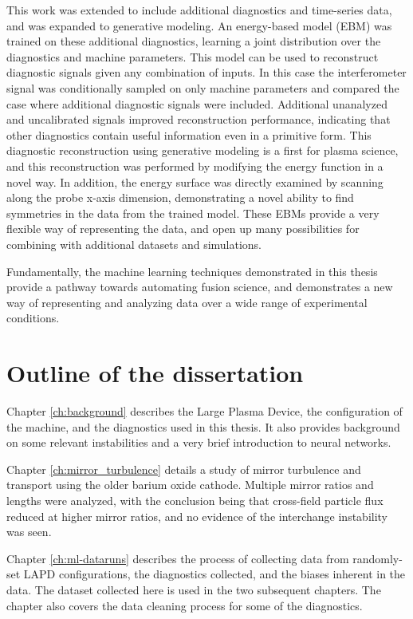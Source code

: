 This work was extended to include additional diagnostics and time-series data, and was expanded to generative modeling. An energy-based model (EBM) was trained on these additional diagnostics, learning a joint distribution over the diagnostics and machine parameters. This model can be used to reconstruct diagnostic signals given any combination of inputs. In this case the interferometer signal was conditionally sampled on only machine parameters and compared the case where additional diagnostic signals were included. Additional unanalyzed and uncalibrated signals improved reconstruction performance, indicating that other diagnostics contain useful information even in a primitive form. This diagnostic reconstruction using generative modeling is a first for plasma science, and this reconstruction was performed by modifying the energy function in a novel way. In addition, the energy surface was directly examined by scanning along the probe x-axis dimension, demonstrating a novel ability to find symmetries in the data from the trained model. These EBMs provide a very flexible way of representing the data, and open up many possibilities for combining with additional datasets and simulations.

Fundamentally, the machine learning techniques demonstrated in this thesis provide a pathway towards automating fusion science, and demonstrates a new way of representing and analyzing data over a wide range of experimental conditions. 

\section{Outline of the dissertation}
Chapter \ref{ch:background} describes the Large Plasma Device, the configuration of the machine, and the diagnostics used in this thesis. It also provides background on some relevant instabilities and a very brief introduction to neural networks. 

Chapter \ref{ch:mirror_turbulence} details a study of mirror turbulence and transport using the older barium oxide cathode. Multiple mirror ratios and lengths were analyzed, with the conclusion being that cross-field particle flux reduced at higher mirror ratios, and no evidence of the interchange instability was seen.

Chapter \ref{ch:ml-dataruns} describes the process of collecting data from randomly-set LAPD configurations, the diagnostics collected, and the biases inherent in the data. The dataset collected here is used in the two subsequent chapters. The chapter also covers the data cleaning process for some of the diagnostics. 


